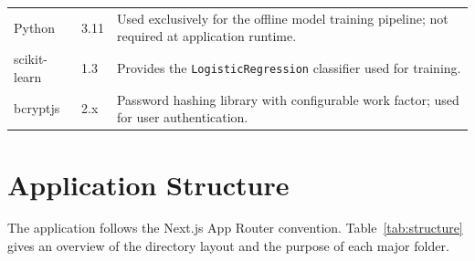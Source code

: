 \begin{table}[H]
\begin{tabularx}{\textwidth}{p{3.5cm} p{1.8cm} X}
    Python               & 3.11       & Used exclusively for the offline model training pipeline; not required at application runtime. \\[4pt]
    scikit-learn         & 1.3        & Provides the \texttt{LogisticRegression} classifier used for training. \citep{pedregosa2011} \\[4pt]
    bcryptjs             & 2.x        & Password hashing library with configurable work factor; used for user authentication. \\[4pt]
    \bottomrule
  \end{tabularx}
\end{table}

\section{Application Structure}

The application follows the Next.js App Router convention. Table~\ref{tab:structure} gives an overview of the directory layout and the purpose of each major folder.

